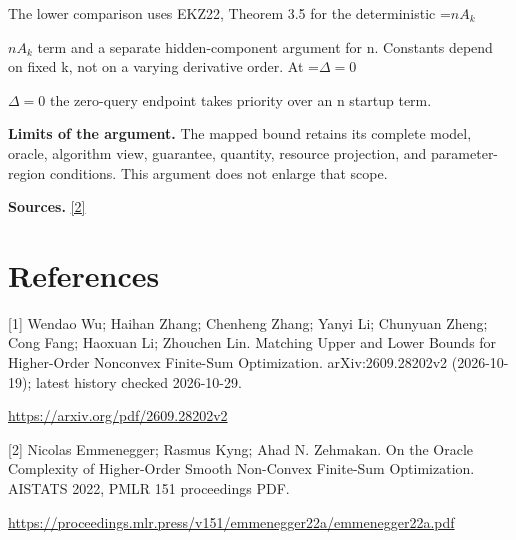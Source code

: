 \documentclass[10pt,a4paper]{article}
\newcommand{\AtlasMath}[1]{\par\begingroup\centering\setbox0=\hbox{$\displaystyle #1$}\ifdim\wd0>1.4\linewidth\typeout{ATLAS WIDE FORMULA: \the\wd0}\fi\ifdim\wd0>\linewidth\resizebox{\linewidth}{!}{\box0}\else\box0\fi\par\endgroup}
\newcommand{\AtlasInlineMath}[1]{\begingroup\setbox0=\hbox{$#1$}\ifdim\wd0>.4\linewidth\endgroup\AtlasMath{#1}\else\endgroup$#1$\fi}
\begin{document}
The lower comparison uses EKZ22, Theorem 3.5 for the deterministic \AtlasInlineMath{nA_k} term and a separate hidden-component argument for n. Constants depend on fixed k, not on a varying derivative order. At \AtlasInlineMath{\Delta=0} the zero-query endpoint takes priority over an n startup term.

\textbf{Limits of the argument.} The mapped bound retains its complete model, oracle, algorithm view, guarantee, quantity, resource projection, and parameter-region conditions. This argument does not enlarge that scope.

\textbf{Sources.} \href{https://proceedings.mlr.press/v151/emmenegger22a/emmenegger22a.pdf}{[2]}

\section{References}
[1] Wendao Wu; Haihan Zhang; Chenheng Zhang; Yanyi Li; Chunyuan Zheng; Cong Fang; Haoxuan Li; Zhouchen Lin. Matching Upper and Lower Bounds for Higher-Order Nonconvex Finite-Sum Optimization. arXiv:2609.28202v2 (2026-10-19); latest history checked 2026-10-29.

\url{https://arxiv.org/pdf/2609.28202v2}

[2] Nicolas Emmenegger; Rasmus Kyng; Ahad N. Zehmakan. On the Oracle Complexity of Higher-Order Smooth Non-Convex Finite-Sum Optimization. AISTATS 2022, PMLR 151 proceedings PDF.

\url{https://proceedings.mlr.press/v151/emmenegger22a/emmenegger22a.pdf}
\end{document}
